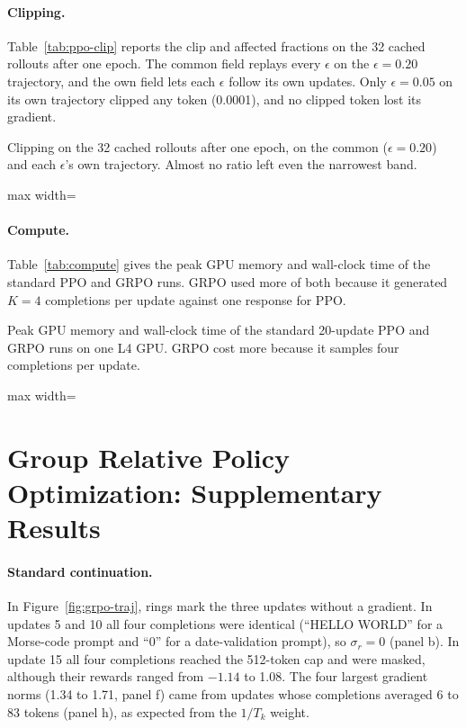 \documentclass{article}
\newcommand{\tablebody}[1]{\small\setlength{\tabcolsep}{4pt}\begin{adjustbox}{max width=\linewidth}\end{adjustbox}}
\begin{document}
\paragraph{Clipping.} Table~\ref{tab:ppo-clip} reports the clip and affected fractions on the 32 cached rollouts after one epoch. The common field replays every $\epsilon$ on the $\epsilon = 0.20$ trajectory, and the own field lets each $\epsilon$ follow its own updates. Only $\epsilon = 0.05$ on its own trajectory clipped any token (0.0001), and no clipped token lost its gradient.

\begin{table}[!htb]
  \centering
  \caption{Clipping on the 32 cached rollouts after one epoch, on the common ($\epsilon = 0.20$) and each $\epsilon$'s own trajectory. Almost no ratio left even the narrowest band.}
  \label{tab:ppo-clip}
  \tablebody{tables/t2_clip.tex}
\end{table}

\paragraph{Compute.} Table~\ref{tab:compute} gives the peak GPU memory and wall-clock time of the standard PPO and GRPO runs. GRPO used more of both because it generated $K = 4$ completions per update against one response for PPO.

\begin{table}[!htb]
  \centering
  \caption{Peak GPU memory and wall-clock time of the standard 20-update PPO and GRPO runs on one L4 GPU. GRPO cost more because it samples four completions per update.}
  \label{tab:compute}
  \tablebody{tables/x_compute.tex}
\end{table}

\section{Group Relative Policy Optimization: Supplementary Results}
\label{app:grpo}

\paragraph{Standard continuation.} In Figure~\ref{fig:grpo-traj}, rings mark the three updates without a gradient. In updates 5 and 10 all four completions were identical (``HELLO WORLD'' for a Morse-code prompt and ``0'' for a date-validation prompt), so $\sigma_r = 0$ (panel b). In update 15 all four completions reached the 512-token cap and were masked, although their rewards ranged from $-1.14$ to 1.08. The four largest gradient norms (1.34 to 1.71, panel f) came from updates whose completions averaged 6 to 83 tokens (panel h), as expected from the $1/T_k$ weight.
\end{document}

